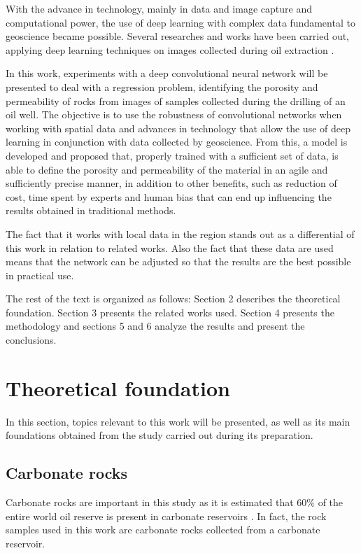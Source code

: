 \documentclass[a4paper,fleqn]{cas-sc}
\begin{document}
With the advance in technology, mainly in data and image capture and computational power, the use of deep learning with complex data fundamental to geoscience became possible. Several researches and works have been carried out, applying deep learning techniques on images collected during oil extraction \cite{Tahmasebi2020}.

In this work, experiments with a deep convolutional neural network will be presented to deal with a regression problem, identifying the porosity and permeability of rocks from images of samples collected during the drilling of an oil well. The objective is to use the robustness of convolutional networks when working with spatial data and advances in technology that allow the use of deep learning in conjunction with data collected by geoscience. From this, a model is developed and proposed that, properly trained with a sufficient set of data, is able to define the porosity and permeability of the material in an agile and sufficiently precise manner, in addition to other benefits, such as reduction of cost, time spent by experts and human bias that can end up influencing the results obtained in traditional methods.

The fact that it works with local data in the region stands out as a differential of this work in relation to related works. Also the fact that these data are used means that the network can be adjusted so that the results are the best possible in practical use.

The rest of the text is organized as follows: Section 2 describes the theoretical foundation. Section 3 presents the related works used. Section 4 presents the methodology and sections 5 and 6 analyze the results and present the conclusions.
\section{Theoretical foundation}
In this section, topics relevant to this work will be presented, as well as its main foundations obtained from the study carried out during its preparation.

\subsection{Carbonate rocks}
Carbonate rocks are important in this study as it is estimated that 60\% of the entire world oil reserve is present in carbonate reservoirs \cite{akbar2000snapshot}. In fact, the rock samples used in this work are carbonate rocks collected from a carbonate reservoir.
\end{document}
